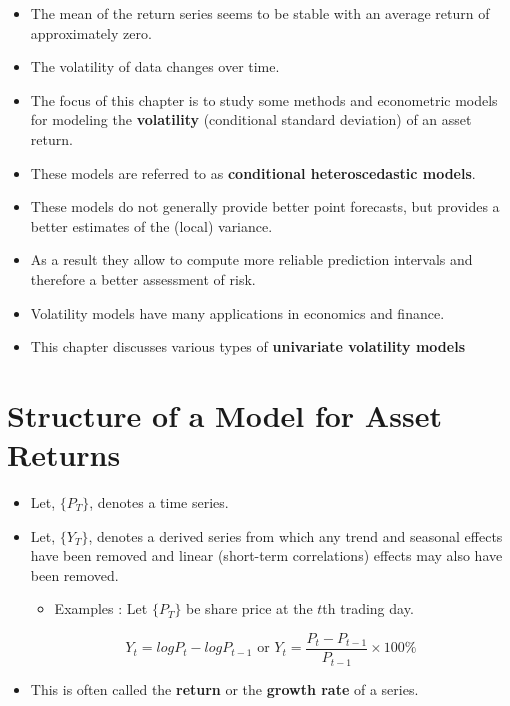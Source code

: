 \documentclass[]{book}
\providecommand{\tightlist}{%
  \setlength{\itemsep}{0pt}\setlength{\parskip}{0pt}}
\begin{document}
\begin{itemize}
\item
  The mean of the return series seems to be stable with an average return of approximately zero.
\item
  The volatility of data changes over time.
\item
  The focus of this chapter is to study some methods and econometric models for modeling the \textbf{volatility} (conditional standard deviation) of an asset return. 
\item
  These models are referred to as \textbf{conditional heteroscedastic models}.
\item
  These models do not generally provide better point forecasts, but provides a better estimates of the (local) variance.
\item
  As a result they allow to compute more reliable prediction intervals and therefore a better assessment of risk.
\item
  Volatility models have many applications in economics and finance.
\item
  This chapter discusses various types of \textbf{univariate volatility models}
\end{itemize}

\hypertarget{structure-of-a-model-for-asset-returns}{%
\section{Structure of a Model for Asset Returns}\label{structure-of-a-model-for-asset-returns}}

\begin{itemize}
\item
  Let, \(\{P_T\}\), denotes a time series.
\item
  Let, \(\{Y_T\}\), denotes a derived series from which any trend and seasonal effects have been removed and linear (short-term correlations) effects may also have been removed.

  \begin{itemize}
  \tightlist
  \item
    Examples : Let \(\{P_T\}\) be share price at the \(t\)th trading day.
  \end{itemize}

  \[Y_t=log P_t - log P_{t-1} \text{  or  } Y_t = \frac{P_t-P_{t-1}}{P_{t-1} }\times100\%\]
\end{itemize}

\begin{itemize}
\tightlist
\item
  This is often called the \textbf{return} or the \textbf{growth rate} of a series.
\end{itemize}
\end{document}
